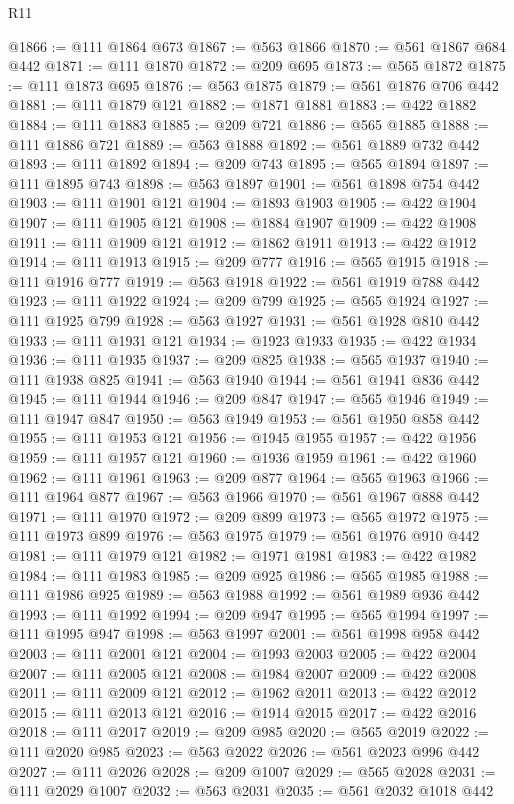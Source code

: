 \begin{lexlean}{R11}
\begin{coremodule}
@1866 := @111 @1864 @673
@1867 := @563 @1866
@1870 := @561 @1867 @684 @442
@1871 := @111 @1870
@1872 := @209 @695
@1873 := @565 @1872
@1875 := @111 @1873 @695
@1876 := @563 @1875
@1879 := @561 @1876 @706 @442
@1881 := @111 @1879 @121
@1882 := @1871 @1881
@1883 := @422 @1882
@1884 := @111 @1883
@1885 := @209 @721
@1886 := @565 @1885
@1888 := @111 @1886 @721
@1889 := @563 @1888
@1892 := @561 @1889 @732 @442
@1893 := @111 @1892
@1894 := @209 @743
@1895 := @565 @1894
@1897 := @111 @1895 @743
@1898 := @563 @1897
@1901 := @561 @1898 @754 @442
@1903 := @111 @1901 @121
@1904 := @1893 @1903
@1905 := @422 @1904
@1907 := @111 @1905 @121
@1908 := @1884 @1907
@1909 := @422 @1908
@1911 := @111 @1909 @121
@1912 := @1862 @1911
@1913 := @422 @1912
@1914 := @111 @1913
@1915 := @209 @777
@1916 := @565 @1915
@1918 := @111 @1916 @777
@1919 := @563 @1918
@1922 := @561 @1919 @788 @442
@1923 := @111 @1922
@1924 := @209 @799
@1925 := @565 @1924
@1927 := @111 @1925 @799
@1928 := @563 @1927
@1931 := @561 @1928 @810 @442
@1933 := @111 @1931 @121
@1934 := @1923 @1933
@1935 := @422 @1934
@1936 := @111 @1935
@1937 := @209 @825
@1938 := @565 @1937
@1940 := @111 @1938 @825
@1941 := @563 @1940
@1944 := @561 @1941 @836 @442
@1945 := @111 @1944
@1946 := @209 @847
@1947 := @565 @1946
@1949 := @111 @1947 @847
@1950 := @563 @1949
@1953 := @561 @1950 @858 @442
@1955 := @111 @1953 @121
@1956 := @1945 @1955
@1957 := @422 @1956
@1959 := @111 @1957 @121
@1960 := @1936 @1959
@1961 := @422 @1960
@1962 := @111 @1961
@1963 := @209 @877
@1964 := @565 @1963
@1966 := @111 @1964 @877
@1967 := @563 @1966
@1970 := @561 @1967 @888 @442
@1971 := @111 @1970
@1972 := @209 @899
@1973 := @565 @1972
@1975 := @111 @1973 @899
@1976 := @563 @1975
@1979 := @561 @1976 @910 @442
@1981 := @111 @1979 @121
@1982 := @1971 @1981
@1983 := @422 @1982
@1984 := @111 @1983
@1985 := @209 @925
@1986 := @565 @1985
@1988 := @111 @1986 @925
@1989 := @563 @1988
@1992 := @561 @1989 @936 @442
@1993 := @111 @1992
@1994 := @209 @947
@1995 := @565 @1994
@1997 := @111 @1995 @947
@1998 := @563 @1997
@2001 := @561 @1998 @958 @442
@2003 := @111 @2001 @121
@2004 := @1993 @2003
@2005 := @422 @2004
@2007 := @111 @2005 @121
@2008 := @1984 @2007
@2009 := @422 @2008
@2011 := @111 @2009 @121
@2012 := @1962 @2011
@2013 := @422 @2012
@2015 := @111 @2013 @121
@2016 := @1914 @2015
@2017 := @422 @2016
@2018 := @111 @2017
@2019 := @209 @985
@2020 := @565 @2019
@2022 := @111 @2020 @985
@2023 := @563 @2022
@2026 := @561 @2023 @996 @442
@2027 := @111 @2026
@2028 := @209 @1007
@2029 := @565 @2028
@2031 := @111 @2029 @1007
@2032 := @563 @2031
@2035 := @561 @2032 @1018 @442

\end{coremodule}
\end{lexlean}
